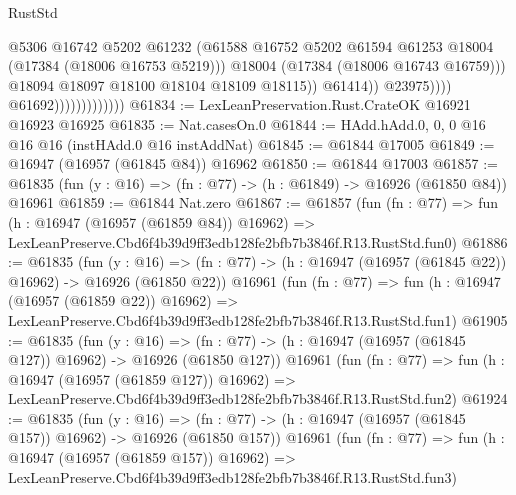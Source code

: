 \begin{lexlean}{RustStd}
\begin{coremodule}
                                                @5306
                                                @16742
                                                @5202
                                                @61232
                                                (@61588
                                                  @16752
                                                  @5202
                                                  @61594
                                                  @61253
                                                  @18004
                                                  (@17384 (@18006 @16753 @5219)))
                                                @18004
                                                (@17384 (@18006 @16743 @16759)))
                                              @18094
                                              @18097
                                              @18100
                                              @18104
                                              @18109
                                              @18115))
                                          @61414))
                                      @23975))))
                              @61692)))))))))))))
@61834 := LexLeanPreservation.Rust.CrateOK @16921 @16923 @16925
@61835 := Nat.casesOn.{0}
@61844 := HAdd.hAdd.{0, 0, 0} @16 @16 @16 (instHAdd.{0} @16 instAddNat)
@61845 := @61844 @17005
@61849 := @16947 (@16957 (@61845 @84)) @16962
@61850 := @61844 @17003
@61857 := @61835 (fun (y : @16) => (fn : @77) -> (h : @61849) -> @16926 (@61850 @84)) @16961
@61859 := @61844 Nat.zero
@61867 := @61857
    (fun (fn : @77) =>
    fun (h : @16947 (@16957 (@61859 @84)) @16962) =>
    LexLeanPreserve.Cbd6f4b39d9ff3edb128fe2bfb7b3846f.R13.RustStd.fun0)
@61886 := @61835
    (fun (y : @16) =>
    (fn : @77) -> (h : @16947 (@16957 (@61845 @22)) @16962) -> @16926 (@61850 @22))
    @16961
    (fun (fn : @77) =>
    fun (h : @16947 (@16957 (@61859 @22)) @16962) =>
    LexLeanPreserve.Cbd6f4b39d9ff3edb128fe2bfb7b3846f.R13.RustStd.fun1)
@61905 := @61835
    (fun (y : @16) =>
    (fn : @77) -> (h : @16947 (@16957 (@61845 @127)) @16962) -> @16926 (@61850 @127))
    @16961
    (fun (fn : @77) =>
    fun (h : @16947 (@16957 (@61859 @127)) @16962) =>
    LexLeanPreserve.Cbd6f4b39d9ff3edb128fe2bfb7b3846f.R13.RustStd.fun2)
@61924 := @61835
    (fun (y : @16) =>
    (fn : @77) -> (h : @16947 (@16957 (@61845 @157)) @16962) -> @16926 (@61850 @157))
    @16961
    (fun (fn : @77) =>
    fun (h : @16947 (@16957 (@61859 @157)) @16962) =>
    LexLeanPreserve.Cbd6f4b39d9ff3edb128fe2bfb7b3846f.R13.RustStd.fun3)

\end{coremodule}
\end{lexlean}
